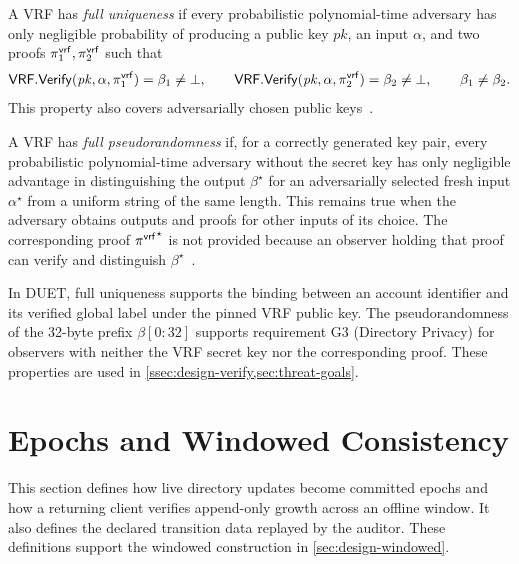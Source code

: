 \begin{definition}\label{def:vrf-security}
A VRF has \emph{full uniqueness} if every probabilistic polynomial-time adversary has only
negligible probability of producing a public key $\mathit{pk}$, an input $\alpha$, and two proofs
$\pi^{\mathsf{vrf}}_1,\pi^{\mathsf{vrf}}_2$ such that
\[
\mathsf{VRF.Verify}(\mathit{pk},\alpha,\pi^{\mathsf{vrf}}_1)=\beta_1 \neq \bot,
\qquad
\mathsf{VRF.Verify}(\mathit{pk},\alpha,\pi^{\mathsf{vrf}}_2)=\beta_2 \neq \bot,
\qquad
\beta_1\neq\beta_2.
\]
This property also covers adversarially chosen public
keys~\cite[Section~3.1]{rfc9381}.

A VRF has \emph{full pseudorandomness} if, for a correctly generated key pair, every probabilistic
polynomial-time adversary without the secret key has only negligible advantage in distinguishing
the output $\beta^\star$ for an adversarially selected fresh input $\alpha^\star$ from a uniform
string of the same length. This remains true when the adversary obtains outputs and proofs for other
inputs of its choice. The corresponding proof ${\pi^{\mathsf{vrf}}}^{\star}$ is not
provided because an observer holding that proof can verify and distinguish
$\beta^\star$~\cite[Section~3.4]{rfc9381}.

In DUET, full uniqueness supports the binding between an account identifier and its verified global
label under the pinned VRF public key. The pseudorandomness of the 32-byte prefix
$\beta[0{:}32]$ supports requirement G3 (Directory Privacy) for observers with neither the VRF
secret key nor the corresponding proof. These properties are used in
\cref{ssec:design-verify,sec:threat-goals}.
\end{definition}

\section{Epochs and Windowed Consistency}\label{sec:def-epoch}

This section defines how live directory updates become committed epochs and how a returning client
verifies append-only growth across an offline window. It also defines the declared transition data
replayed by the auditor. These definitions support the windowed construction in
\cref{sec:design-windowed}.

